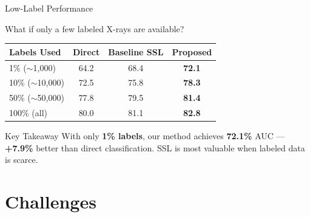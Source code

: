\documentclass{beamer}
\begin{document}
\begin{frame}{Low-Label Performance}
\begin{block}{What if only a few labeled X-rays are available?}
\end{block}
\vspace{6pt}
\begin{table}
\centering
\begin{tabular}{@{}lccc@{}}
\toprule
\textbf{Labels Used} & \textbf{Direct} & \textbf{Baseline SSL} & \textbf{Proposed} \\
\midrule
1\% ($\sim$1,000)   & 64.2 & 68.4 & \textbf{72.1} \\
10\% ($\sim$10,000)  & 72.5 & 75.8 & \textbf{78.3} \\
50\% ($\sim$50,000)  & 77.8 & 79.5 & \textbf{81.4} \\
100\% (all)          & 80.0 & 81.1 & \textbf{82.8} \\
\bottomrule
\end{tabular}
\end{table}
\vspace{6pt}
\begin{block}{Key Takeaway}
With only \textbf{1\% labels}, our method achieves \textbf{72.1\%} AUC --- \textbf{+7.9\%} better than direct classification. SSL is most valuable when labeled data is scarce.
\end{block}
\end{frame}


\section{Challenges}
\end{document}
